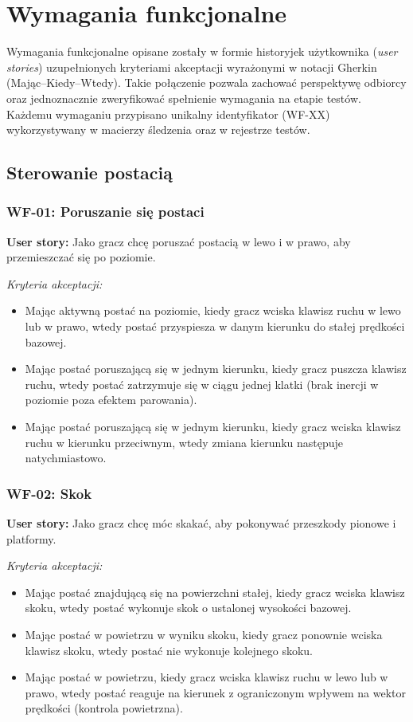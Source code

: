 \section{Wymagania funkcjonalne}
Wymagania funkcjonalne opisane zostały w formie historyjek użytkownika (\textit{user stories}) uzupełnionych kryteriami akceptacji wyrażonymi w notacji Gherkin (Mając--Kiedy--Wtedy). Takie połączenie pozwala zachować perspektywę odbiorcy oraz jednoznacznie zweryfikować spełnienie wymagania na etapie testów. Każdemu wymaganiu przypisano unikalny identyfikator (WF-XX) wykorzystywany w macierzy śledzenia oraz w rejestrze testów.

\subsection{Sterowanie postacią}

\subsubsection*{WF-01: Poruszanie się postaci}
\textbf{User story:} Jako gracz chcę poruszać postacią w lewo i w prawo, aby przemieszczać się po poziomie.

\textit{Kryteria akceptacji:}
\begin{itemize}[noitemsep]
    \item Mając aktywną postać na poziomie, kiedy gracz wciska klawisz ruchu w lewo lub w prawo, wtedy postać przyspiesza w danym kierunku do stałej prędkości bazowej.
    \item Mając postać poruszającą się w jednym kierunku, kiedy gracz puszcza klawisz ruchu, wtedy postać zatrzymuje się w ciągu jednej klatki (brak inercji w poziomie poza efektem parowania).
    \item Mając postać poruszającą się w jednym kierunku, kiedy gracz wciska klawisz ruchu w kierunku przeciwnym, wtedy zmiana kierunku następuje natychmiastowo.
\end{itemize}

\subsubsection*{WF-02: Skok}
\textbf{User story:} Jako gracz chcę móc skakać, aby pokonywać przeszkody pionowe i platformy.

\textit{Kryteria akceptacji:}
\begin{itemize}[noitemsep]
    \item Mając postać znajdującą się na powierzchni stałej, kiedy gracz wciska klawisz skoku, wtedy postać wykonuje skok o ustalonej wysokości bazowej.
    \item Mając postać w powietrzu w wyniku skoku, kiedy gracz ponownie wciska klawisz skoku, wtedy postać nie wykonuje kolejnego skoku.
    \item Mając postać w powietrzu, kiedy gracz wciska klawisz ruchu w lewo lub w prawo, wtedy postać reaguje na kierunek z ograniczonym wpływem na wektor prędkości (kontrola powietrzna).
\end{itemize}

